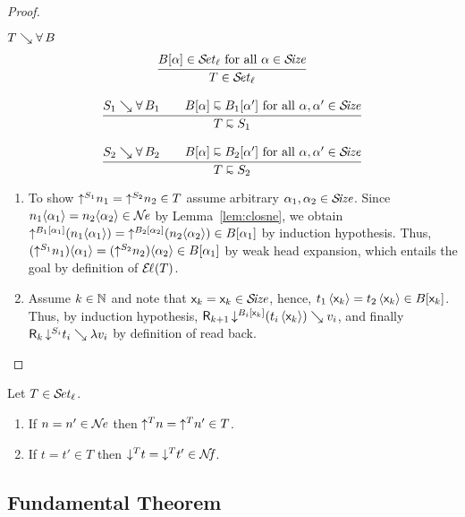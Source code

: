 \documentclass[acmlarge,review,anonymous]{acmart}\settopmatter{printfolios=true}
\begin{document}
\begin{proof}
\begin{caselist}
\nextcase $T \evalsto \forallT B$
\begin{gather*}
  \ru{B[\alpha] \in \SET[\ell] \mforall \alpha \in \SIZE
    }{T \in \SET[\ell]}
\\[2ex]
  \ru{S_1 \evalsto \forallT{B_1} \qquad
      B[\alpha] \shape B_1[\alpha'] \mforall \alpha, \alpha' \in \SIZE
    }{T \shape S_1}
\\[2ex]
  \ru{S_2 \evalsto \forallT{B_2} \qquad
      B[\alpha] \shape B_2[\alpha'] \mforall \alpha, \alpha' \in \SIZE
    }{T \shape S_2}
\end{gather*}
\begin{enumerate}
\item To show $\up{S_1}{n_1} = \up{S_2}{n_2} \in T$ assume arbitrary $\alpha_1,\alpha_2 \in \SIZE$.
  Since $n_1 \ann{\alpha_1} = n_2 \ann{\alpha_2} \in \NE$ by Lemma~\ref{lem:closne}, we obtain
  $\up{B_1[\alpha_1]}{(n_1 \ann{\alpha_1})} = \up{B_2[\alpha_2]}{(n_2 \ann{\alpha_2})} \in B[\alpha_1]$
  by induction hypothesis.
  Thus, $(\up{S_1}{n_1}) \ann{\alpha_1} = (\up{S_2}{n_2}) \ann{\alpha_2} \in B[\alpha_1]$
  by weak head expansion, which entails the goal by definition of $\EL(T)$.
\item Assume $k \in \NN$ and note that $\lev k = \lev k \in \SIZE$, hence,
  $t_1\,\ann{\lev k} = t_2\,\ann{\lev k} \in B[\lev k]$.  Thus, by induction hypothesis,
  $\R{k+1}{\down{B_i[\lev k]}(t_i\,\ann{\lev k})}{v_i}$, and finally
  $\R k {\down{S_i} t_i} {\lambda v_i}$ by definition of read back.

\end{enumerate}

\end{caselist}
\end{proof}

\begin{corollary}
  \label{cor:rere}
  Let\/ $T \in \SET[\ell]$.
  \begin{enumerate}
  \item If $n = n' \in \NE$ then $\up T n = \up T n' \in T$.
  \item If $t = t' \in T$ then $\down T t = \down T {t'} \in \NF$.
  \end{enumerate}
\end{corollary}


\subsection{Fundamental Theorem}
\label{sec:fund}
\end{document}
